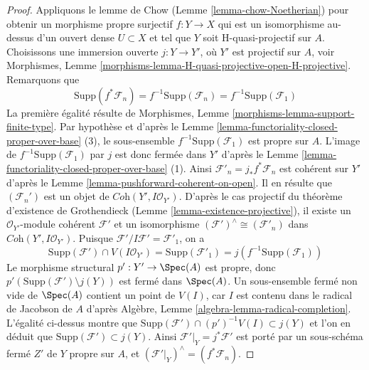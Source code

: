 \begin{proof}
\medskip\noindent
Appliquons le lemme de Chow (Lemme \ref{lemma-chow-Noetherian}) pour obtenir un
morphisme propre surjectif $f : Y \to X$ qui est un isomorphisme
au-dessus d'un ouvert dense $U \subset X$ et tel que $Y$ soit H-quasi-projectif
sur $A$. Choisissons une immersion ouverte $j : Y \to Y'$, où
$Y'$ est projectif sur $A$, voir
Morphismes, Lemme \ref{morphisms-lemma-H-quasi-projective-open-H-projective}.
Remarquons que
$$
\text{Supp}(f^*\mathcal{F}_n) = f^{-1}\text{Supp}(\mathcal{F}_n) =
f^{-1}\text{Supp}(\mathcal{F}_1)
$$
La première égalité résulte de
Morphismes, Lemme \ref{morphisms-lemma-support-finite-type}.
Par hypothèse et d'après le
Lemme \ref{lemma-functoriality-closed-proper-over-base} (3),
le sous-ensemble $f^{-1}\text{Supp}(\mathcal{F}_1)$ est propre sur $A$.
L'image de $f^{-1}\text{Supp}(\mathcal{F}_1)$
par $j$ est donc fermée dans $Y'$ d'après le
Lemme \ref{lemma-functoriality-closed-proper-over-base} (1).
Ainsi $\mathcal{F}'_n = j_*f^*\mathcal{F}_n$ est cohérent sur
$Y'$ d'après le Lemme \ref{lemma-pushforward-coherent-on-open}.
Il en résulte que $(\mathcal{F}_n')$
est un objet de $\textit{Coh}(Y', I\mathcal{O}_{Y'})$.
D'après le cas projectif du théorème d'existence de Grothendieck
(Lemme \ref{lemma-existence-projective}),
il existe un $\mathcal{O}_{Y'}$-module cohérent
$\mathcal{F}'$ et un isomorphisme
$(\mathcal{F}')^\wedge \cong (\mathcal{F}'_n)$ dans
$\textit{Coh}(Y', I\mathcal{O}_{Y'})$.
Puisque $\mathcal{F}'/I\mathcal{F}' = \mathcal{F}'_1$, on a
$$
\text{Supp}(\mathcal{F}') \cap V(I\mathcal{O}_{Y'}) =
\text{Supp}(\mathcal{F}'_1) = j(f^{-1}\text{Supp}(\mathcal{F}_1))
$$
Le morphisme structural $p' : Y' \to \Spec(A)$ est propre, donc
$p'(\text{Supp}(\mathcal{F}') \setminus j(Y))$
est fermé dans $\Spec(A)$. Un sous-ensemble fermé non vide de $\Spec(A)$
contient un point de $V(I)$, car $I$ est contenu dans le radical de Jacobson
de $A$ d'après Algèbre, Lemme \ref{algebra-lemma-radical-completion}.
L'égalité ci-dessus montre que
$\text{Supp}(\mathcal{F}') \cap (p')^{-1}V(I) \subset j(Y)$
et l'on en déduit que $\text{Supp}(\mathcal{F}') \subset j(Y)$.
Ainsi $\mathcal{F}'|_Y = j^*\mathcal{F}'$
est porté par un sous-schéma fermé $Z'$ de $Y$ propre sur $A$,
et $(\mathcal{F}'|_Y)^\wedge = (f^*\mathcal{F}_n)$.


\end{proof}
